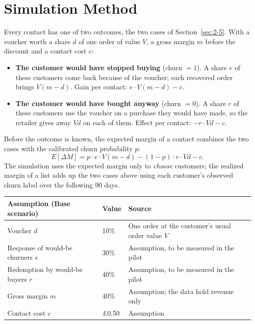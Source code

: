 \section{Simulation Method}
\label{sec:7-2}

Every contact has one of two outcomes, the two cases of Section~\ref{sec:2-5}. With a voucher worth a share $d$ of one order of value $V$, a gross margin $m$ before the discount and a contact cost $c$:
\begin{itemize}
    \item \textbf{The customer would have stopped buying} (churn $= 1$). A share $e$ of these customers come back because of the voucher; each recovered order brings $V(m - d)$. Gain per contact: $e \cdot V (m - d) - c$.
    \item \textbf{The customer would have bought anyway} (churn $= 0$). A share $r$ of these customers use the voucher on a purchase they would have made, so the retailer gives away $V d$ on each of them. Effect per contact: $-r \cdot V d - c$.
\end{itemize}
Before the outcome is known, the expected margin of a contact combines the two cases with the calibrated churn probability $p$:
\begin{equation*}
    E[\Delta M] = p \cdot e \cdot V (m - d) - (1 - p) \cdot r \cdot V d - c.
\end{equation*}
The simulation uses the expected margin only to \emph{choose} customers; the realized margin of a list adds up the two cases above using each customer's observed churn label over the following 90 days.

\begin{center}
\begin{tabular}{@{}p{4.8cm}p{2cm}p{7.4cm}@{}}
    \toprule
    Assumption (Base scenario) & Value & Source \\
    \midrule
    Voucher $d$ & 10\% & One order at the customer's usual order value $V$ \\
    Response of would-be churners $e$ & 30\% & Assumption, to be measured in the pilot \\
    Redemption by would-be buyers $r$ & 40\% & Assumption, to be measured in the pilot \\
    Gross margin $m$ & 40\% & Assumption; the data hold revenue only \\
    Contact cost $c$ & \pounds0.50 & Assumption \\
    \bottomrule
\end{tabular}
\end{center}

